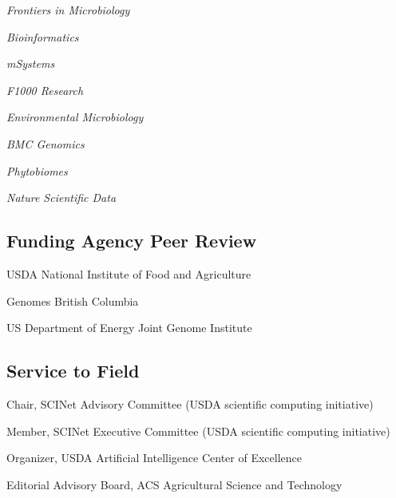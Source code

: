 \documentclass[12pt,letterpaper]{report}
\newcommand{\listitemspace}{0.15em}
\renewenvironment{itemize}
{\begin{list}{}{\setlength{\leftmargin}{0em}
            \setlength{\parskip}{0em}
            \setlength{\itemsep}{\listitemspace}
            \setlength{\parsep}{\listitemspace}}}
    {\end{list}}
\begin{document}
    \begin{itemize}
        
        \item \textit{Frontiers in Microbiology}
        \item \textit{Bioinformatics}
        \item \textit{mSystems}
        \item \textit{F1000 Research}
        \item \textit{Environmental Microbiology}
        \item \textit{BMC Genomics}
        \item \textit{Phytobiomes}
        \item \textit{Nature Scientific Data}


    \end{itemize}


    \subsection*{Funding Agency Peer Review}

    \begin{itemize}

        \item USDA National Institute of Food and Agriculture

        \item Genomes British Columbia
        
        \item US Department of Energy Joint Genome Institute

    \end{itemize}

    \subsection*{Service to Field}

    \begin{itemize}

        \item Chair, SCINet Advisory Committee (USDA scientific computing initiative)      
        \item Member, SCINet Executive Committee (USDA scientific computing initiative)
        \item Organizer, USDA Artificial Intelligence  Center of Excellence
        \item Editorial Advisory Board,  ACS Agricultural Science and Technology


    \end{itemize}
\end{document}
